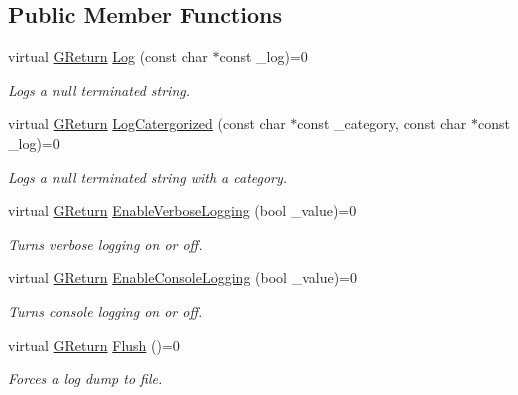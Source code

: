 \subsection*{Public Member Functions}
\begin{DoxyCompactItemize}
\item 
virtual \mbox{\hyperlink{namespace_g_w_a67a839e3df7ea8a5c5686613a7a3de21}{G\+Return}} \mbox{\hyperlink{class_g_w_1_1_s_y_s_t_e_m_1_1_g_log_a9e21e702d012065fe799b4c49f7ac670}{Log}} (const char $\ast$const \+\_\+log)=0
\begin{DoxyCompactList}\small\item\em Logs a null terminated string. \end{DoxyCompactList}\item 
virtual \mbox{\hyperlink{namespace_g_w_a67a839e3df7ea8a5c5686613a7a3de21}{G\+Return}} \mbox{\hyperlink{class_g_w_1_1_s_y_s_t_e_m_1_1_g_log_a5d10397fa6aeeebaf8430df6029ec3c5}{Log\+Catergorized}} (const char $\ast$const \+\_\+category, const char $\ast$const \+\_\+log)=0
\begin{DoxyCompactList}\small\item\em Logs a null terminated string with a category. \end{DoxyCompactList}\item 
virtual \mbox{\hyperlink{namespace_g_w_a67a839e3df7ea8a5c5686613a7a3de21}{G\+Return}} \mbox{\hyperlink{class_g_w_1_1_s_y_s_t_e_m_1_1_g_log_adea469091bba33b419f7e88a9c2c3049}{Enable\+Verbose\+Logging}} (bool \+\_\+value)=0
\begin{DoxyCompactList}\small\item\em Turns verbose logging on or off. \end{DoxyCompactList}\item 
virtual \mbox{\hyperlink{namespace_g_w_a67a839e3df7ea8a5c5686613a7a3de21}{G\+Return}} \mbox{\hyperlink{class_g_w_1_1_s_y_s_t_e_m_1_1_g_log_a1eb651aa3d5b6b8baac389be284a569d}{Enable\+Console\+Logging}} (bool \+\_\+value)=0
\begin{DoxyCompactList}\small\item\em Turns console logging on or off. \end{DoxyCompactList}\item 
virtual \mbox{\hyperlink{namespace_g_w_a67a839e3df7ea8a5c5686613a7a3de21}{G\+Return}} \mbox{\hyperlink{class_g_w_1_1_s_y_s_t_e_m_1_1_g_log_a07147c15ecb17caa1c83974b3c54f7d4}{Flush}} ()=0
\begin{DoxyCompactList}\small\item\em Forces a log dump to file. \end{DoxyCompactList}\end{DoxyCompactItemize}


